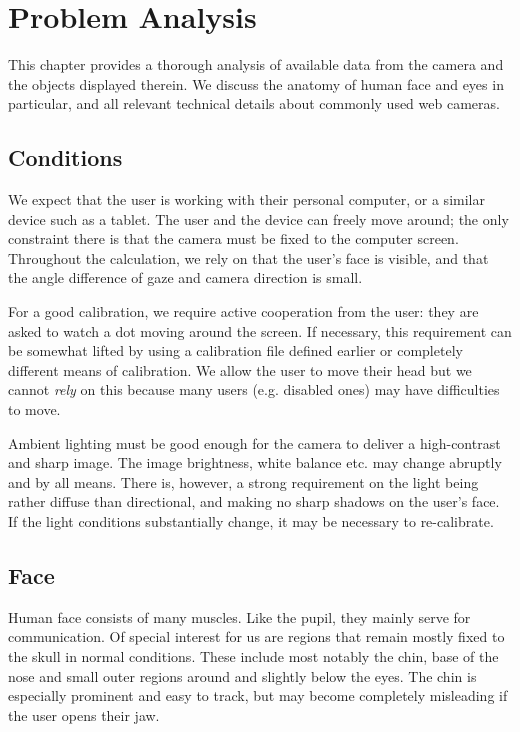 \chapter{Problem Analysis}

This chapter provides a thorough analysis of available data from the camera and the objects displayed therein.
We discuss the anatomy of human face and eyes in particular, and all relevant technical details about commonly used web cameras.

\section{Conditions}

We expect that the user is working with their personal computer, or a similar device such as a tablet.
The user and the device can freely move around; the only constraint there is that the camera must be fixed to the computer screen.
Throughout the calculation, we rely on that the user's face is visible, and that the angle difference of gaze and camera direction is small.

For a good calibration, we require active cooperation from the user: they are asked to watch a dot moving around the screen.
If necessary, this requirement can be somewhat lifted by using a calibration file defined earlier or completely different means of calibration.
We allow the user to move their head but we cannot \textit{rely} on this because many users (e.g. disabled ones) may have difficulties to move.

Ambient lighting must be good enough for the camera to deliver a high-contrast and sharp image.
The image brightness, white balance etc. may change abruptly and by all means.
There is, however, a strong requirement on the light being rather diffuse than directional, and making no sharp shadows on the user's face.
If the light conditions substantially change, it may be necessary to re-calibrate.

\section{Face}

Human face consists of many muscles.
Like the pupil, they mainly serve for communication.
Of special interest for us are regions that remain mostly fixed to the skull in normal conditions.
These include most notably the chin, base of the nose and small outer regions around and slightly below the eyes.
The chin is especially prominent and easy to track, but may become completely misleading if the user opens their jaw.
\todo{\dots}


